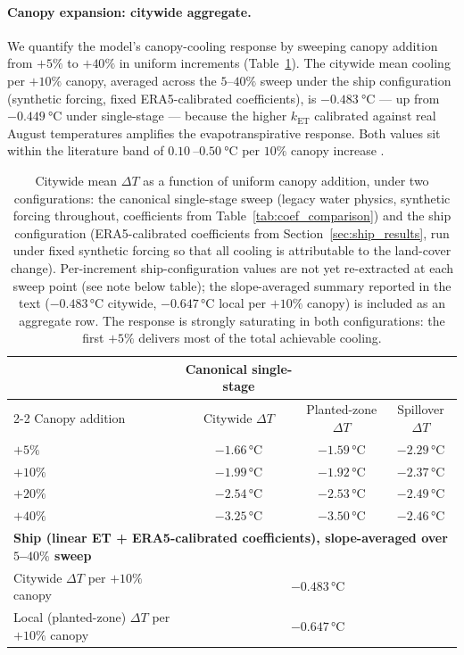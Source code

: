 \documentclass[12pt, letterpaper]{article}
\begin{document}
\paragraph{Canopy expansion: citywide aggregate.}
We quantify the model's canopy-cooling response by sweeping canopy addition
from $+5\%$ to $+40\%$ in uniform increments (Table~\ref{tab:canopy_sweep}).
The citywide mean cooling per $+10\%$ canopy, averaged across the
$5$--$40\%$ sweep under the ship configuration (synthetic forcing,
fixed ERA5-calibrated coefficients), is $\SI{-0.483}{\degreeCelsius}$
— up from $\SI{-0.449}{\degreeCelsius}$ under single-stage — because
the higher $k_{\mathrm{ET}}$ calibrated against real August temperatures
amplifies the evapotranspirative response. Both values sit within the
literature band of $\SI{0.10}{}$--$\SI{0.50}{\degreeCelsius}$ per
$10\%$ canopy increase \citep{wri2026cooling, zhou2025tree}.

\begin{table}[ht]
  \centering
  \caption{Citywide mean $\Delta T$ as a function of uniform canopy addition,
  under two configurations: the canonical single-stage sweep (legacy water
  physics, synthetic forcing throughout, coefficients from
  Table~\ref{tab:coef_comparison}) and the ship configuration (ERA5-calibrated
  coefficients from Section~\ref{sec:ship_results}, run under fixed synthetic
  forcing so that all cooling is attributable to the land-cover change).
  Per-increment ship-configuration values are not yet re-extracted at each
  sweep point (see note below table); the slope-averaged summary reported
  in the text ($-0.483$\,°C citywide, $-0.647$\,°C local per $+10\%$ canopy)
  is included as an aggregate row. The response is strongly saturating in
  both configurations: the first $+5\%$ delivers most of the total
  achievable cooling.}
  \label{tab:canopy_sweep}
  \begin{tabular}{lccc}
    \toprule
    & \multicolumn{1}{c}{Canonical single-stage} & &  \\
    \cmidrule(lr){2-2}
    Canopy addition & Citywide $\Delta T$ & Planted-zone $\Delta T$ &
      Spillover $\Delta T$ \\
    \midrule
    $+5\%$  & $-1.66$\,°C & $-1.59$\,°C & $-2.29$\,°C \\
    $+10\%$ & $-1.99$\,°C & $-1.92$\,°C & $-2.37$\,°C \\
    $+20\%$ & $-2.54$\,°C & $-2.53$\,°C & $-2.49$\,°C \\
    $+40\%$ & $-3.25$\,°C & $-3.50$\,°C & $-2.46$\,°C \\
    \midrule
    \multicolumn{4}{l}{\textbf{Ship (linear ET + ERA5-calibrated coefficients), slope-averaged over $5$--$40\%$ sweep}} \\
    \midrule
    Citywide $\Delta T$ per $+10\%$ canopy & \multicolumn{3}{c}{$-0.483$\,°C} \\
    Local (planted-zone) $\Delta T$ per $+10\%$ canopy & \multicolumn{3}{c}{$-0.647$\,°C} \\
    \bottomrule
  \end{tabular}
\end{table}
\end{document}
